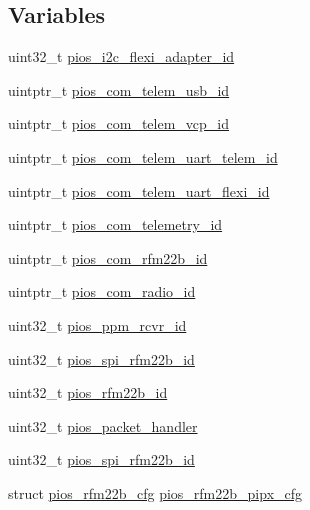 \subsection*{\-Variables}
\begin{DoxyCompactItemize}
\item 
uint32\-\_\-t \hyperlink{group___pip_xtreme_ga00c59288b3ddcecb262b920ef5ae6ce1}{pios\-\_\-i2c\-\_\-flexi\-\_\-adapter\-\_\-id}
\item 
uintptr\-\_\-t \hyperlink{group___pip_xtreme_ga513cc36d72b76de2fcb75ff233a79a4a}{pios\-\_\-com\-\_\-telem\-\_\-usb\-\_\-id}
\item 
uintptr\-\_\-t \hyperlink{group___pip_xtreme_gaad17224bb36a5f3c73a716320de2b604}{pios\-\_\-com\-\_\-telem\-\_\-vcp\-\_\-id}
\item 
uintptr\-\_\-t \hyperlink{group___pip_xtreme_ga921f0eb0351c5bfb72fa30333cd8dbe1}{pios\-\_\-com\-\_\-telem\-\_\-uart\-\_\-telem\-\_\-id}
\item 
uintptr\-\_\-t \hyperlink{group___pip_xtreme_ga756d20d3ee409603f69b54c0bf4c5584}{pios\-\_\-com\-\_\-telem\-\_\-uart\-\_\-flexi\-\_\-id}
\item 
uintptr\-\_\-t \hyperlink{group___pip_xtreme_gac90e37dffee878bd2e1e9d2020b6a1de}{pios\-\_\-com\-\_\-telemetry\-\_\-id}
\item 
uintptr\-\_\-t \hyperlink{group___pip_xtreme_ga960a23c3c0c4fd41826d65e01651b737}{pios\-\_\-com\-\_\-rfm22b\-\_\-id}
\item 
uintptr\-\_\-t \hyperlink{group___pip_xtreme_ga7bf37c2a11a82f3cee715b9e09638dce}{pios\-\_\-com\-\_\-radio\-\_\-id}
\item 
uint32\-\_\-t \hyperlink{group___pip_xtreme_ga6338d4e922eaddddb7e8cb253a901907}{pios\-\_\-ppm\-\_\-rcvr\-\_\-id}
\item 
uint32\-\_\-t \hyperlink{group___pip_xtreme_ga32bd307cbb8a4dcde0609dbd263ef65f}{pios\-\_\-spi\-\_\-rfm22b\-\_\-id}
\item 
uint32\-\_\-t \hyperlink{group___pip_xtreme_ga1e0b7d2eb8b8640e07daa1f381780972}{pios\-\_\-rfm22b\-\_\-id}
\item 
uint32\-\_\-t \hyperlink{group___pip_xtreme_gab0199d5aedb7be35cb1d6880ee21f8ac}{pios\-\_\-packet\-\_\-handler}
\item 
uint32\-\_\-t \hyperlink{group___pip_xtreme_ga32bd307cbb8a4dcde0609dbd263ef65f}{pios\-\_\-spi\-\_\-rfm22b\-\_\-id}
\item 
struct \hyperlink{structpios__rfm22b__cfg}{pios\-\_\-rfm22b\-\_\-cfg} \hyperlink{group___pip_xtreme_ga8bfaf47f84e519c2b523c9029cd8d624}{pios\-\_\-rfm22b\-\_\-pipx\-\_\-cfg}

\end{DoxyCompactItemize}
